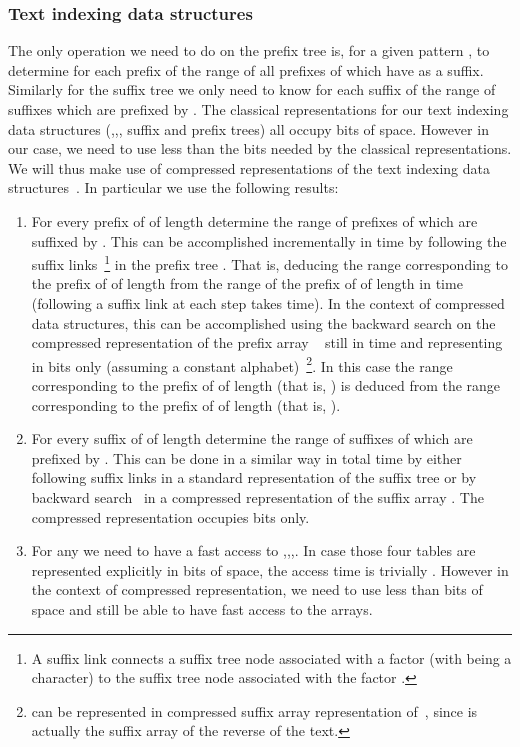 \documentclass{article}
\newcommand{\?}{\mskip1.5mu}
\begin{document}
\subsubsection{Text indexing data structures}
The only operation we need to do on the prefix tree is, for a given pattern , to determine for each prefix  of  the range of all prefixes of  which have  as a suffix. Similarly for the suffix tree we only need to know for each suffix  of  the range of suffixes which are prefixed by . 
The classical representations for our text indexing data structures (,,, suffix and prefix trees) all occupy  bits of space. However in our case, we need to use less than the  bits needed by the classical representations. We will thus make use of compressed representations of the text indexing data structures~\cite{FM05,GV05}. In particular we use the following results: 
\begin{enumerate}
\item For every prefix  of  of length  determine the range  of prefixes of  which are suffixed by . This can be  accomplished incrementally in  time by following the suffix links~\footnote{A suffix link connects a suffix tree node associated with a factor  (with  being a character) to the suffix tree node associated with the factor .} in the prefix tree . That is, deducing the range corresponding to the prefix of  of length  from the range of the prefix of  of length  in  time (following a suffix link at each step takes  time). In the context of compressed data structures, this can be accomplished using the backward search on the compressed representation of the prefix array ~\cite{FM05} still in time  and representing  in  bits only (assuming a constant alphabet)~\footnote{ can be represented in compressed suffix array representation of~\cite{FM05}, since  is actually the suffix array of the reverse of the text.}. In this case the range corresponding to the prefix of  of length  (that is, ) is deduced from the range corresponding to the prefix of  of length  (that is, ). 

\item For every suffix  of  of length  determine the range  of suffixes of  which are prefixed by . This can be done in a similar way in total  time by either following suffix links in a standard representation of the suffix tree  or by backward search~\cite{FM05} in a compressed representation of the suffix array . The compressed representation occupies  bits only.  
\item For any  we need to have a fast access to ,,,. In case those four tables are represented  explicitly in  bits of space, the access time is trivially . However in the context of compressed representation, we need to use less than  bits of space and still be able to have fast access to the arrays. 
\end{enumerate}
\end{document}
